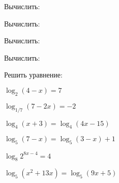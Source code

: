 \begin{class}[number=2]
	\begin{listofex}
		\item Вычислить:
		\begin{enumcols}[itemcolumns=3]
			\item {}
			\item {}
			\item {}
			\item {}
			\item {}
		\end{enumcols}
		\item Вычислить:
		\begin{enumcols}[itemcolumns=3]
			\item {}
			\item {}
			\item {}
		\end{enumcols}
		\item Вычислить:
		\begin{enumcols}[itemcolumns=3]
			\item {}
			\item {}
			\item {}
			\item {}
			\item {}
			\item {}
			\item {}
		\end{enumcols}
		\item Вычислить:
		\begin{enumcols}[itemcolumns=2]
			\item {}
			\item {}
			\item {}
			\item {}
		\end{enumcols}
		\item Решить уравнение:
		\begin{enumcols}[itemcolumns=2]
			\item \( \log_2(4-x)=7 \)
			\item \( \log_{1/7}(7-2x)=-2 \)
			\item \( \log_4(x+3)=\log_4(4x-15) \)
			\item \( \log_5(7-x)=\log_5(3-x)+1 \)
			\item \( \log_8 2^{8x-4}=4 \)
			\item \( \log_5(x^2+13x)=\log_5(9x+5) \)
		\end{enumcols}
	\end{listofex}
\end{class}
